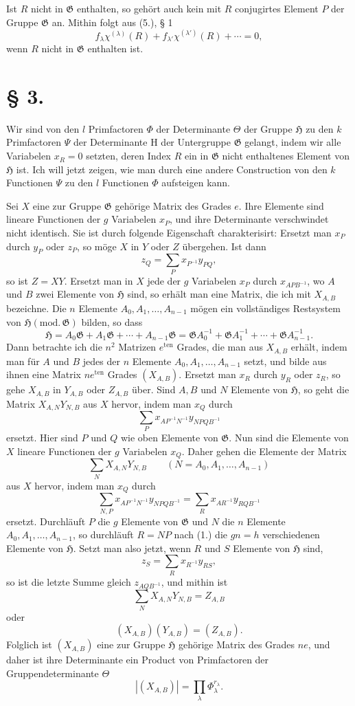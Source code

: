 \documentclass[11pt]{article}
\newcommand{\Hgr}{\mathfrak{H}}
\newcommand{\Ggr}{\mathfrak{G}}
\begin{document}
Ist $R$ nicht in $\Ggr$ enthalten, so gehört auch kein mit $R$ conjugirtes Element $P$ der Gruppe $\Ggr$ an. Mithin folgt aus (5.), § 1
\[
\tag{5.}
  f_\lambda\chi^{(\lambda)}(R)+f_{\lambda'}\chi^{(\lambda')}(R)+\cdots=0,
\]
wenn $R$ nicht in $\Ggr$ enthalten ist.

\section*{§ 3.}

Wir sind von den $l$ Primfactoren $\Phi$ der Determinante $\Theta$ der Gruppe $\Hgr$ zu den $k$ Primfactoren $\Psi$ der Determinante $\mathrm H$ der Untergruppe $\Ggr$ gelangt, indem wir alle Variabelen $x_R=0$ setzten, deren Index $R$ ein in $\Ggr$ nicht enthaltenes Element von $\Hgr$ ist. Ich will jetzt zeigen, wie man durch eine andere Construction von den $k$ Functionen $\Psi$ zu den $l$ Functionen $\Phi$ aufsteigen kann.

Sei $X$ eine zur Gruppe $\Ggr$ gehörige Matrix des Grades $e$. Ihre Elemente sind lineare Functionen der $g$ Variabelen $x_P$, und ihre Determinante verschwindet nicht identisch. Sie ist durch folgende Eigenschaft charakterisirt: Ersetzt man $x_P$ durch $y_P$ oder $z_P$, so möge $X$ in $Y$ oder $Z$ übergehen. Ist dann
\[
  z_Q=\sum_P x_{P^{-1}}y_{PQ},
\]
so ist $Z=XY$. Ersetzt man in $X$ jede der $g$ Variabelen $x_P$ durch $x_{APB^{-1}}$, wo $A$ und $B$ zwei Elemente von $\Hgr$ sind, so erhält man eine Matrix, die ich mit $X_{A,B}$ bezeichne. Die $n$ Elemente $A_0,A_1,\ldots,A_{n-1}$ mögen ein vollständiges Restsystem von $\Hgr(\mathrm{mod.}\,\Ggr)$ bilden, so dass
\[
\tag{1.}
  \Hgr=A_0\Ggr+A_1\Ggr+\cdots+A_{n-1}\Ggr
  =
  \Ggr A_0^{-1}+\Ggr A_1^{-1}+\cdots+\Ggr A_{n-1}^{-1}.
\]
Dann betrachte ich die $n^2$ Matrizen $e^{\mathrm{ten}}$ Grades, die man aus $X_{A,B}$ erhält, indem man für $A$ und $B$ jedes der $n$ Elemente $A_0,A_1,\ldots,A_{n-1}$ setzt, und bilde aus ihnen eine Matrix $ne^{\mathrm{ten}}$ Grades $(X_{A,B})$. Ersetzt man $x_R$ durch $y_R$ oder $z_R$, so gehe $X_{A,B}$ in $Y_{A,B}$ oder $Z_{A,B}$ über. Sind $A,B$ und $N$ Elemente von $\Hgr$, so geht die Matrix $X_{A,N}Y_{N,B}$ aus $X$ hervor, indem man $x_Q$ durch
\[
  \sum_P x_{AP^{-1}N^{-1}}y_{NPQB^{-1}}
\]
ersetzt. Hier sind $P$ und $Q$ wie oben Elemente von $\Ggr$. Nun sind die Elemente von $X$ lineare Functionen der $g$ Variabelen $x_Q$. Daher gehen die Elemente der Matrix
\[
  \sum_N X_{A,N}Y_{N,B}
  \qquad(N=A_0,A_1,\ldots,A_{n-1})
\]
aus $X$ hervor, indem man $x_Q$ durch
\[
  \sum_{N,P}x_{AP^{-1}N^{-1}}y_{NPQB^{-1}}
  =
  \sum_R x_{AR^{-1}}y_{RQB^{-1}}
\]
ersetzt. Durchläuft $P$ die $g$ Elemente von $\Ggr$ und $N$ die $n$ Elemente $A_0,A_1,\ldots,A_{n-1}$, so durchläuft $R=NP$ nach (1.) die $gn=h$ verschiedenen Elemente von $\Hgr$. Setzt man also jetzt, wenn $R$ und $S$ Elemente von $\Hgr$ sind,
\[
  z_S=\sum_R x_{R^{-1}}y_{RS},
\]
so ist die letzte Summe gleich $z_{AQB^{-1}}$, und mithin ist
\[
  \sum_N X_{A,N}Y_{N,B}=Z_{A,B}
\]
oder
\[
  (X_{A,B})(Y_{A,B})=(Z_{A,B}).
\]
Folglich ist $(X_{A,B})$ eine zur Gruppe $\Hgr$ gehörige Matrix des Grades $ne$, und daher ist ihre Determinante ein Product von Primfactoren der Gruppendeterminante $\Theta$
\[
\tag{2.}
  |(X_{A,B})|=\prod_\lambda \Phi_\lambda^{r_\lambda}.
\]
\end{document}
